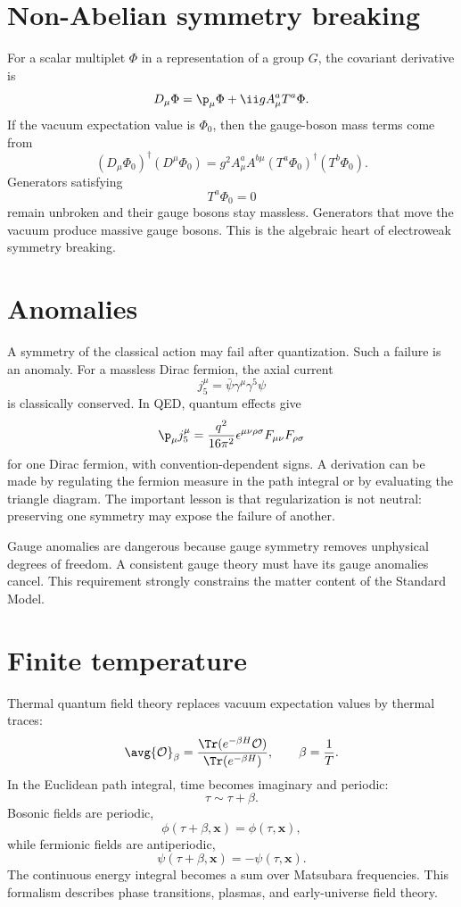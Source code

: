\section{Non-Abelian symmetry breaking}

For a scalar multiplet \(\Phi\) in a representation of a group \(G\), the covariant derivative is
\[
  D_\mu\Phi=\p_\mu\Phi+\ii gA_\mu^aT^a\Phi.
\]
If the vacuum expectation value is \(\Phi_0\), then the gauge-boson mass terms come from
\[
  (D_\mu\Phi_0)^\dagger(D^\mu\Phi_0)
  =
  g^2 A_\mu^aA^{b\mu}
  (T^a\Phi_0)^\dagger(T^b\Phi_0).
\]
Generators satisfying
\[
  T^a\Phi_0=0
\]
remain unbroken and their gauge bosons stay massless.  Generators that move the vacuum produce massive gauge bosons.  This is the algebraic heart of electroweak symmetry breaking.

\section{Anomalies}

A symmetry of the classical action may fail after quantization.  Such a failure is an anomaly.  For a massless Dirac fermion, the axial current
\[
  j_5^\mu=\bar\psi\gamma^\mu\gamma^5\psi
\]
is classically conserved.  In QED, quantum effects give
\[
  \p_\mu j_5^\mu
  =
  \frac{q^2}{16\pi^2}
  \epsilon^{\mu\nu\rho\sigma}F_{\mu\nu}F_{\rho\sigma}
  \]
for one Dirac fermion, with convention-dependent signs.  A derivation can be made by regulating the fermion measure in the path integral or by evaluating the triangle diagram.  The important lesson is that regularization is not neutral: preserving one symmetry may expose the failure of another.

Gauge anomalies are dangerous because gauge symmetry removes unphysical degrees of freedom.  A consistent gauge theory must have its gauge anomalies cancel.  This requirement strongly constrains the matter content of the Standard Model.

\section{Finite temperature}

Thermal quantum field theory replaces vacuum expectation values by thermal traces:
\[
  \avg{\mathcal O}_\beta
  =
  \frac{\Tr(e^{-\beta H}\mathcal O)}{\Tr(e^{-\beta H})},
  \qquad
  \beta=\frac1T.
\]
In the Euclidean path integral, time becomes imaginary and periodic:
\[
  \tau\sim\tau+\beta.
\]
Bosonic fields are periodic,
\[
  \phi(\tau+\beta,\bm x)=\phi(\tau,\bm x),
\]
while fermionic fields are antiperiodic,
\[
  \psi(\tau+\beta,\bm x)=-\psi(\tau,\bm x).
\]
The continuous energy integral becomes a sum over Matsubara frequencies.  This formalism describes phase transitions, plasmas, and early-universe field theory.


